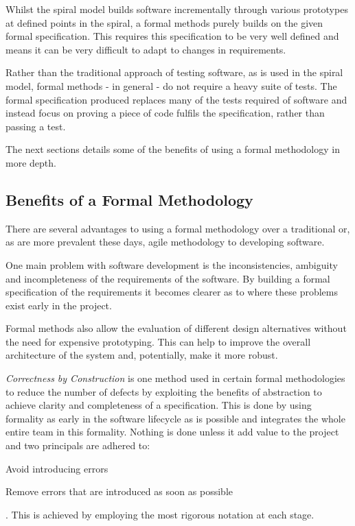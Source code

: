 \documentclass[10pt, a4paper, notitlepage, fleqn]{article}
\begin{document}
Whilst the spiral model builds software incrementally through various prototypes at defined points
in the spiral, a formal methods purely builds on the given formal specification. This requires 
this specification to be very well defined and means it can be very difficult to adapt to changes
in requirements.

Rather than the traditional approach of testing software, as is used in the spiral model, formal
methods - in general - do not require a heavy suite of tests. The formal specification produced
replaces many of the tests required of software and instead focus on proving a piece of code 
fulfils the specification, rather than passing a test.

The next sections details some of the benefits of using a formal methodology in more depth.


\subsection*{Benefits of a Formal Methodology}
There are several advantages to using a formal methodology over a traditional or, as are more
prevalent these days, agile methodology to developing software.

One main problem with software development is the inconsistencies, ambiguity and incompleteness of
the requirements of the software. By building a formal specification of the requirements it 
becomes clearer as to where these problems exist early in the project.

Formal methods also allow the evaluation of different design alternatives without the need for 
expensive prototyping. This can help to improve the overall architecture of the system and, 
potentially, make it more robust.

\emph{Correctness by Construction}\cite{Chapman:2006:CCM:1151816.1151820} is one method used in certain formal methodologies to
reduce the number of defects by exploiting the benefits of abstraction to achieve clarity and 
completeness of a specification. This is done by using formality as early in the software 
lifecycle as is possible and integrates the whole entire team in this formality. Nothing is done
unless it add value to the project and two principals are adhered to:
\begin{inparaenum}
\item Avoid introducing errors
\item Remove errors that are introduced as soon as possible
\end{inparaenum}\cite{Hall2005Formal}. This is achieved by employing the most rigorous notation 
at each stage.
\end{document}

